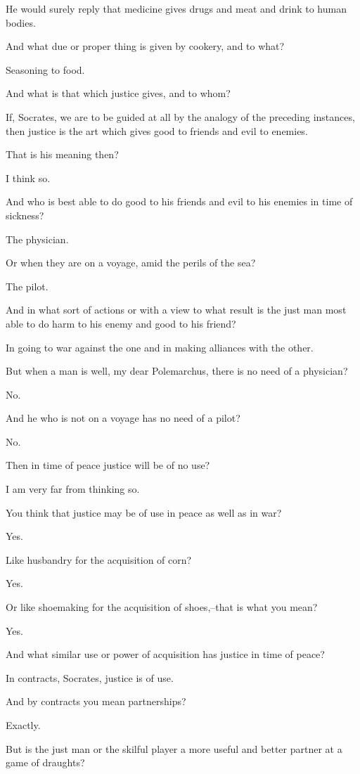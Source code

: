 He would surely reply that medicine gives drugs and meat and drink to
human bodies.

And what due or proper thing is given by cookery, and to what?

Seasoning to food.

And what is that which justice gives, and to whom?

If, Socrates, we are to be guided at all by the analogy of the preceding
instances, then justice is the art which gives good to friends and evil
to enemies.

That is his meaning then?

I think so.

And who is best able to do good to his friends and evil to his enemies
in time of sickness?

The physician.

Or when they are on a voyage, amid the perils of the sea?

The pilot.

And in what sort of actions or with a view to what result is the just
man most able to do harm to his enemy and good to his friend?

In going to war against the one and in making alliances with the other.

But when a man is well, my dear Polemarchus, there is no need of a
physician?

No.

And he who is not on a voyage has no need of a pilot?

No.

Then in time of peace justice will be of no use?

I am very far from thinking so.

You think that justice may be of use in peace as well as in war?

Yes.

Like husbandry for the acquisition of corn?

Yes.

Or like shoemaking for the acquisition of shoes,--that is what you mean?

Yes.

And what similar use or power of acquisition has justice in time of
peace?

In contracts, Socrates, justice is of use.

And by contracts you mean partnerships?

Exactly.

But is the just man or the skilful player a more useful and better
partner at a game of draughts?

